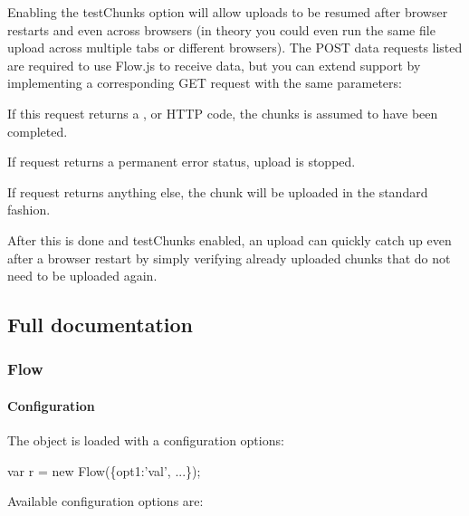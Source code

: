 Enabling the {\ttfamily test\+Chunks} option will allow uploads to be resumed after browser restarts and even across browsers (in theory you could even run the same file upload across multiple tabs or different browsers). The {\ttfamily P\+O\+ST} data requests listed are required to use Flow.\+js to receive data, but you can extend support by implementing a corresponding {\ttfamily G\+ET} request with the same parameters\+:


\begin{DoxyItemize}
\item If this request returns a {}, {} or {} H\+T\+TP code, the chunks is assumed to have been completed.
\item If request returns a permanent error status, upload is stopped.
\item If request returns anything else, the chunk will be uploaded in the standard fashion.
\end{DoxyItemize}

After this is done and {\ttfamily test\+Chunks} enabled, an upload can quickly catch up even after a browser restart by simply verifying already uploaded chunks that do not need to be uploaded again.

\subsection*{Full documentation}

\subsubsection*{Flow}

\paragraph*{Configuration}

The object is loaded with a configuration options\+: 
\begin{DoxyCode}
var r = new Flow(\{opt1:'val', ...\});
\end{DoxyCode}
 Available configuration options are\+:


